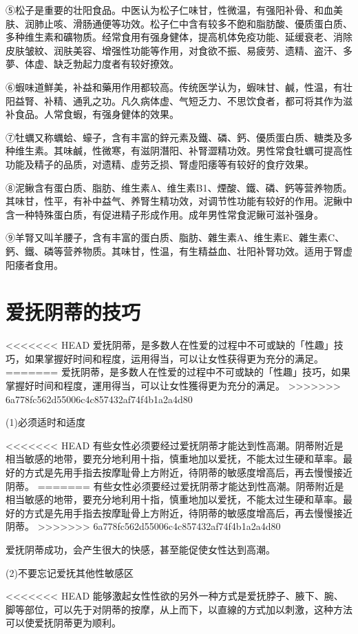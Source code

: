 \documentclass[12pt,UTF8]{ctexbook}
\begin{document}
⑤松子是重要的壮阳食品。中医认为松子仁味甘，性微温，有强阳补骨、和血美肤、润肺止咳、滑肠通便等功效。松子仁中含有较多不飽和脂肪酸、優质蛋白质、多种维生素和礦物质。经常食用有强身健体，提高机体免疫功能、延缓衰老、消除皮肤皱紋、润肤美容、增强性功能等作用，对食欲不振、易疲劳、遗精、盗汗、多夢、体虚、缺乏勃起力度者有较好撩效。

⑥蝦味道鮮美，补益和藥用作用都较高。传统医学认为，蝦味甘、鹹，性温，有壮阳益腎、补精、通乳之功。凡久病体虚、气短乏力、不思饮食者，都可将其作为滋补食品。人常食蝦，有强身健体的效果。

⑦牡蠣又称蠣蛤、蠔子，含有丰富的鋅元素及鐵、磷、鈣、優质蛋白质、糖类及多种维生素。其味鹹，性微寒，有滋阴潛阳、补腎澀精功效。男性常食牡蠣可提高性功能及精子的品质，对遗精、虛劳乏损、腎虛阳痿等有较好的食疗效果。

⑧泥鳅含有蛋白质、脂肪、维生素A、维生素B1、煙酸、鐵、磷、鈣等营养物质。其味甘，性平，有补中益气、养腎生精功效，对调节性功能有较好的作用。泥鳅中含一种特殊蛋白质，有促进精子形成作用。成年男性常食泥鳅可滋补强身。

⑨羊腎又叫羊腰子，含有丰富的蛋白质、脂肪、雜生素A、维生素E、雜生素C、鈣、鐵、磷等营养物质。其味甘，性温，有生精益血、壮阳补腎功效。适用于腎虚阳痿者食用。

\section{爱抚阴蒂的技巧}

<<<<<<< HEAD
爱抚阴蒂，是多数人在性爱的过程中不可或缺的「性趣」技巧，如果掌握好时间和程度，运用得当，可以让女性获得更为充分的满足。
=======
爱抚阴蒂，是多数人在性爱的过程中不可或缺的「性趣」技巧，如果掌握好时间和程度，運用得当，可以让女性獲得更为充分的满足。
>>>>>>> 6a778fc562d55006c4c857432af74f4b1a2a4d80

(1)必须适时和适度

<<<<<<< HEAD
有些女性必须要经过爱抚阴蒂才能达到性高潮。阴蒂附近是相当敏感的地带，要充分地利用十指，慎重地加以爱抚，不能太过生硬和草率。最好的方式是先用手指去按摩耻骨上方附近，待阴蒂的敏感度增高后，再去慢慢接近阴蒂。
=======
有些女性必须要经过爱抚阴蒂才能达到性高潮。阴蒂附近是相当敏感的地带，要充分地利用十指，慎重地加以爱抚，不能太过生硬和草率。最好的方式是先用手指去按摩耻骨上方附近，待阴蒂的敏感度增高后，再去慢慢接近阴蒂。
>>>>>>> 6a778fc562d55006c4c857432af74f4b1a2a4d80

爱抚阴蒂成功，会产生很大的快感，甚至能促使女性达到高潮。

(2)不要忘记爱抚其他性敏感区

<<<<<<< HEAD
能够激起女性性欲的另外一种方式是爱抚脖子、腋下、腕、脚等部位，可以先于对阴蒂的按摩，从上而下，以直線的方式加以刺激，这种方法可以使爱抚阴蒂更为顺利。
\end{document}
